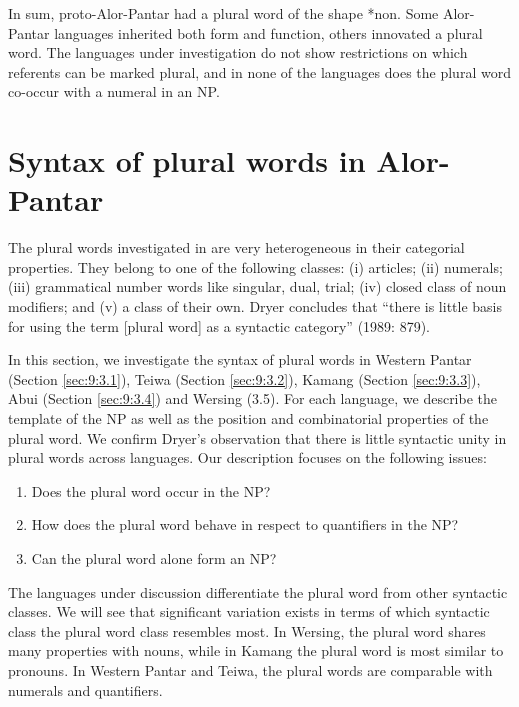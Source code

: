 In sum, proto-Alor-Pantar had a plural word of the shape *non. Some Alor-Pantar languages inherited both form and function, others innovated a plural word. The languages under investigation do not show restrictions on which referents can be marked plural, and in none of the languages does the plural word co-occur with a numeral in an NP.

\section{Syntax of plural words in Alor-Pantar}  %

\label{sec:9:3}
The plural words investigated in \citet{Dryer1989} are very heterogeneous in their categorial properties. They belong to one of the following classes: (i) articles; (ii) numerals; (iii) grammatical number words like singular, dual, trial; (iv) closed class of noun modifiers; and (v) a class of their own. Dryer concludes that ``there is little basis for using the term [plural word] as a syntactic category'' (1989: 879).

In this section, we investigate the syntax of plural words in Western Pantar (Section \ref{sec:9:3.1}), Teiwa (Section \ref{sec:9:3.2}), Kamang (Section \ref{sec:9:3.3}), Abui (Section \ref{sec:9:3.4}) and Wersing (3.5). For each language, we describe the template of the NP as well as the position and combinatorial properties of the plural word. We confirm Dryer's observation that there is little syntactic unity in plural words across languages. Our description focuses on the following issues:

\begin{enumerate}
\item Does the plural word occur in the NP?
\item  How does the plural word behave in respect to quantifiers in the NP?
\item   Can the plural word alone form an NP?
\end{enumerate}

The languages under discussion differentiate the plural word from other syntactic classes. We will see that significant variation exists in terms of which syntactic class the plural word class resembles most. In Wersing, the plural word shares many properties with nouns, while in Kamang the plural word is most similar to pronouns. In Western Pantar and Teiwa, the plural words are comparable with numerals and quantifiers.

